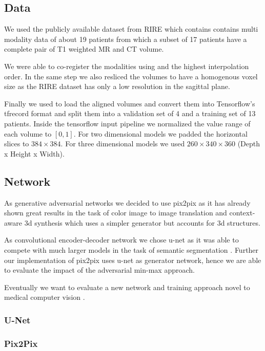 \documentclass[
  a4paper,
  abstracton,
  emulatestandardclasses,
]{scrartcl}
\begin{document}
\subsection{Data}

We used the publicly available dataset from RIRE \cite{RIRE} which contains
contains multi modality data of about 19 patients from which a subset
of 17 patients have a complete pair of T1 weighted MR and CT volume.

We were able to co-register the modalities using \cite{SPM12} and the
highest interpolation order. In the same step we also resliced the volumes
to have a homogenous voxel size as the RIRE dataset has only a low resolution
in the sagittal plane.

Finally we used \cite{Nibabel} to load the aligned volumes and convert them
into Tensorflow's tfrecord format and split them into a validation set of
4 and a training set of 13 patients. Inside the tensorflow input pipeline
we normalized the value range of each volume to $[0,1]$. For two dimensional
models we padded the horizontal slices to $384\times384$. For three
dimensional models we used $260\times340\times360$ (Depth x Height x Width).

\subsection{Network}

As generative adversarial networks we decided to use pix2pix \cite{Isola16}
as it has already shown great results in the task of color image to image
translation and context-aware 3d synthesis \cite{Nie16} which uses a simpler
generator but accounts for 3d structures.

As convolutional encoder-decoder network we chose u-net \cite{Ronneberger15}
as it was able to compete with much larger models in the task of semantic
segmentation \cite{Badrinarayanan15}. Further our implementation of pix2pix
uses u-net as generator network, hence we are able to evaluate the impact
of the adversarial min-max approach.

Eventually we want to evaluate a new network and training approach novel to
medical computer vision \cite{Karras17}.

\subsubsection{U-Net}


\subsubsection{Pix2Pix}
\end{document}
